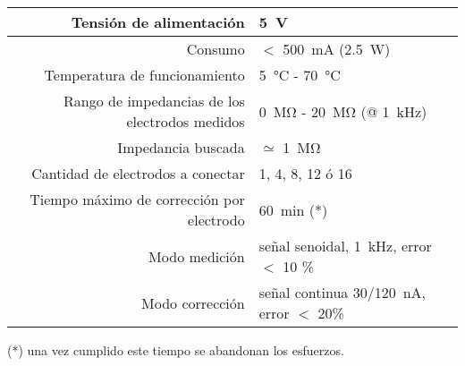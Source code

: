 \begin{table}[H]
\begin{center}
\begin{tabular}{|r|l|}
    \hline
    Tensión de alimentación &
    \SI{5}{\volt} \\ \hline
    Consumo &
    $<$ \SI{500}{\milli\ampere} (\SI{2.5}{\watt}) \\ \hline
    Temperatura de funcionamiento &
    \SI{5}{\celsius} - \SI{70}{\celsius} \\ \hline
    Rango de impedancias de los electrodos medidos &
    \SI{0}{\mega\ohm} - \SI{20}{\mega\ohm} (@ \SI{1}{\kilo\hertz})\\ \hline
    Impedancia buscada & $\simeq$ \SI{1}{\mega\ohm}\\ \hline
    Cantidad de electrodos a conectar &
    1, 4, 8, 12 ó 16 \\ \hline
    Tiempo máximo de corrección por electrodo &
    \SI{60}{\minute} (*)\\ \hline
    Modo medición & señal senoidal, \SI{1}{\kilo\hertz}, error $<$ 10 \% \\ \hline
    Modo corrección & señal continua \SI{30/120}{\nano\ampere}, error $<$ 20\% \\ \hline
\end{tabular}
\end{center}
\end{table}

(*) una vez cumplido este tiempo se abandonan los esfuerzos.



